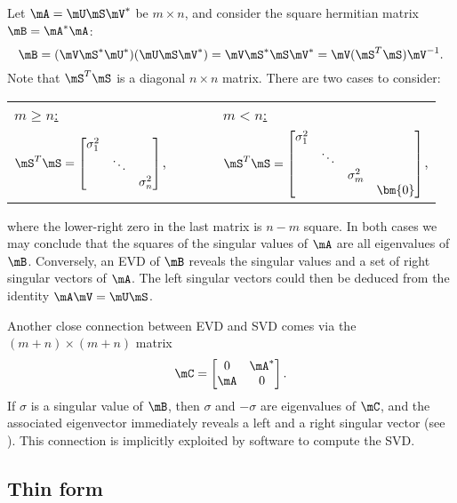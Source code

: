 Let $\mA=\mU\mS\mV^*$ be $m\times n$, and consider the square  hermitian matrix $\mB=\mA^*\mA$:
\begin{equation*}
  \mB = (\mV\mS^*\mU^*) (\mU\mS\mV^*) = \mV\mS^*\mS\mV^* = \mV(\mS^T\mS)\mV^{-1}.
\end{equation*}
Note that $\mS^T\mS$ is a diagonal $n \times n$ matrix. There are two cases to consider:
\begin{center}
  \begin{tabular}{lcl}
    \underline{$m \ge n$:} & $\qquad$ & \underline{$m < n$:} \\
    $\displaystyle \mS^T\mS =
    \begin{bmatrix}
      \sigma_1^2 & & \\
      & \ddots & \\
      & & \sigma_n^2
    \end{bmatrix}$, &  &
    $\displaystyle \mS^T\mS =
    \begin{bmatrix}
      \sigma_1^2 & & & \\
      & \ddots & & \\
      & & \sigma_m^2 & \\
      & & & \bm{0}
    \end{bmatrix}$,
  \end{tabular}
\end{center}
where the lower-right zero in the last matrix is $n-m$ square. In both cases we may conclude that the squares of the singular values of $\mA$ are all eigenvalues of $\mB$. Conversely, an EVD of $\mB$ reveals the singular values and a set of right singular vectors of $\mA$. The left singular vectors could then be deduced from the identity $\mA\mV = \mU\mS$.

Another close connection between EVD and SVD comes via the $(m+n)\times (m+n)$ matrix
\begin{equation}
  \label{eq:svdaugment}
  \mC =
  \begin{bmatrix}
    0 & \mA^* \\ \mA & 0
  \end{bmatrix}.
\end{equation}
If $\sigma$ is a singular value of $\mB$, then $\sigma$ and $-\sigma$ are eigenvalues of $\mC$, and the associated eigenvector immediately reveals a left and a right singular vector (see ). This connection is implicitly exploited by software to compute the SVD.

\subsection{Thin form}

